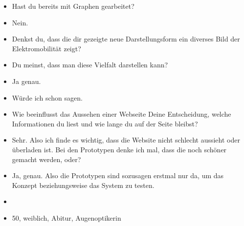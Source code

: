 {\begin{itemize}[]
            \item {} Hast du bereits mit Graphen gearbeitet?
            \item {} Nein.
            \item {} Denkst du, dass die dir gezeigte neue Darstellungsform ein diverses Bild der Elektromobilität zeigt?
            \item {} Du meinst, dass man diese Vielfalt darstellen kann?
            \item {} Ja genau.
            \item {} Würde ich schon sagen.
            \item {} Wie beeinflusst das Aussehen einer Webseite Deine Entscheidung, welche Informationen du liest und wie lange du auf der Seite bleibst?
            \item {} Sehr.
                  Also ich finde es wichtig, dass die Website nicht schlecht aussieht oder überladen ist.
                  Bei den Prototypen denke ich mal, dass die noch schöner gemacht werden, oder?
            \item {} Ja, genau. Also die Prototypen sind sozusagen erstmal nur da, um das Konzept beziehungsweise das System zu testen.
            \item {}
            \item {} 50, weiblich, Abitur, Augenoptikerin
      \end{itemize}}
\nolinenumbers
